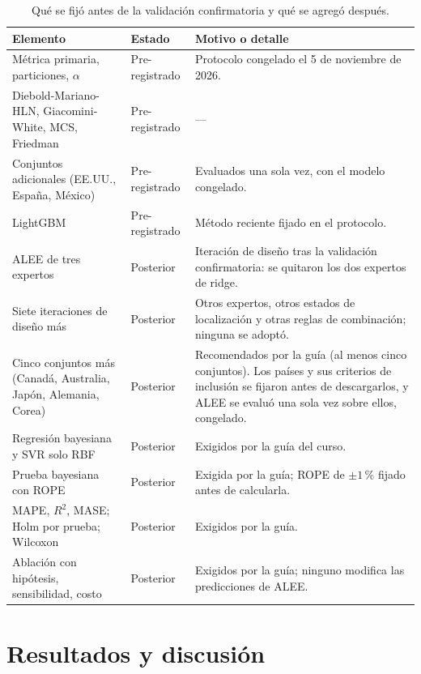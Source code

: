 \documentclass[11pt]{article}
\begin{document}
\begin{table}[H]
\centering
\caption{Qué se fijó antes de la validación confirmatoria y qué se agregó después.}
\label{tab:registro}
\scriptsize
\begin{tabular}{p{4.2cm}p{2.3cm}p{7.6cm}}
\toprule
Elemento & Estado & Motivo o detalle \\
\midrule
Métrica primaria, particiones, $\alpha$ & Pre-registrado & Protocolo congelado el 5 de noviembre de 2026. \\
Diebold-Mariano-HLN, Giacomini-White, MCS, Friedman & Pre-registrado & --- \\
Conjuntos adicionales (EE.UU., España, México) & Pre-registrado & Evaluados una sola vez, con el modelo congelado. \\
LightGBM & Pre-registrado & Método reciente fijado en el protocolo. \\
ALEE de tres expertos & Posterior & Iteración de diseño tras la validación confirmatoria: se quitaron los dos expertos de ridge. \\
Siete iteraciones de diseño más & Posterior & Otros expertos, otros estados de localización y otras reglas de combinación; ninguna se adoptó. \\
Cinco conjuntos más (Canadá, Australia, Japón, Alemania, Corea) & Posterior & Recomendados por la guía (al menos cinco conjuntos). Los países y sus criterios de inclusión se fijaron antes de descargarlos, y ALEE se evaluó una sola vez sobre ellos, congelado. \\
Regresión bayesiana y SVR solo RBF & Posterior & Exigidos por la guía del curso. \\
Prueba bayesiana con ROPE & Posterior & Exigida por la guía; ROPE de $\pm1$\,\% fijado antes de calcularla. \\
MAPE, $R^2$, MASE; Holm por prueba; Wilcoxon & Posterior & Exigidos por la guía. \\
Ablación con hipótesis, sensibilidad, costo & Posterior & Exigidos por la guía; ninguno modifica las predicciones de ALEE. \\
\bottomrule
\end{tabular}
\end{table}

\newpage

\section{Resultados y discusión}
\label{sec:resultados}
\end{document}
